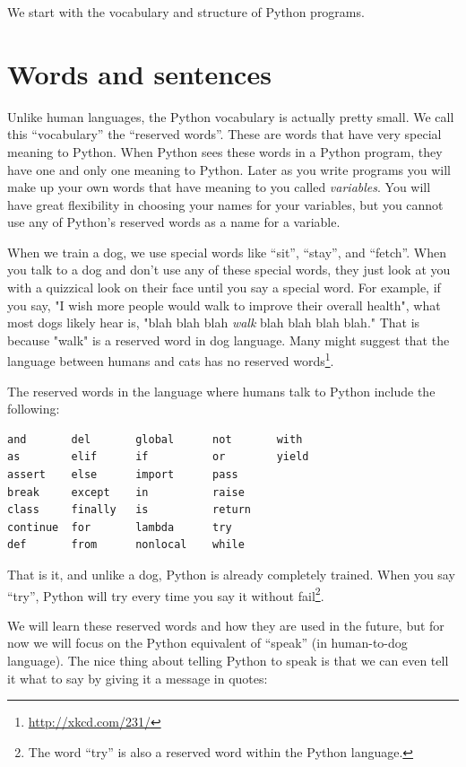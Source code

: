 We start with the vocabulary and structure of Python programs.

\hypertarget{palabras-y-frases}{%
\section{Words and sentences}\label{palabras-y-frases}}

 

Unlike human languages, the Python vocabulary is actually pretty small. We call this ``vocabulary'' the ``reserved words''. These are words that have very special meaning to Python. When Python sees these words in a Python program, they have one and only one meaning to Python. Later as you write programs you will make up your own words that have meaning to you called \emph{variables}. You will have great flexibility in choosing your names for your variables, but you cannot use any of Python's reserved words as a name for a variable.

When we train a dog, we use special words like ``sit'', ``stay'', and ``fetch''. When you talk to a dog and don't use any of these special words, they just look at you with a quizzical look on their face until you say a special word. For example, if you say, "I wish more people would walk to improve their overall health", what most dogs likely hear is, "blah blah blah \emph{walk} blah blah blah blah." That is because "walk" is a reserved word in dog language. Many might suggest that the language between humans and cats has no reserved words\footnote{\url{http://xkcd.com/231/}}.

The reserved words in the language where humans talk to Python include the following:

\begin{verbatim}
and       del       global      not       with
as        elif      if          or        yield
assert    else      import      pass      
break     except    in          raise
class     finally   is          return
continue  for       lambda      try
def       from      nonlocal    while    
\end{verbatim}

That is it, and unlike a dog, Python is already completely trained. When you say ``try'', Python will try every time you say it without fail\footnote{The word ``try'' is also a reserved word within the
Python language.}.

We will learn these reserved words and how they are used in the future, but for now we will focus on the Python equivalent of ``speak'' (in human-to-dog language). The nice thing about telling Python to speak is that we can even tell it what to say by giving it a message in quotes:

